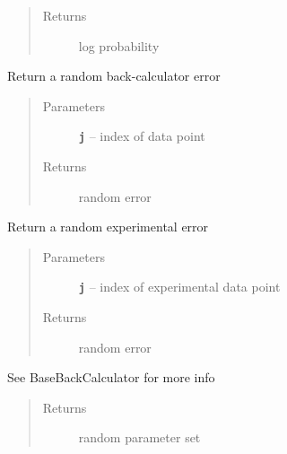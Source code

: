 \documentclass[letterpaper,10pt,english]{sphinxmanual}
\begin{document}
\begin{fulllineitems}
\begin{fulllineitems}
\begin{quote}
\begin{description}
\begin{itemize}
\end{itemize}

\item[{Returns}] \leavevmode
log probability

\end{description}\end{quote}

\end{fulllineitems}


\begin{fulllineitems}
\label{modules:eisd.DataEISD._random_bc_err}
Return a random back-calculator error
\begin{quote}\begin{description}
\item[{Parameters}] \leavevmode
\textbf{\texttt{j}} -- index of data point

\item[{Returns}] \leavevmode
random error

\end{description}\end{quote}

\end{fulllineitems}


\begin{fulllineitems}
\label{modules:eisd.DataEISD._random_exp_err}
Return a random experimental error
\begin{quote}\begin{description}
\item[{Parameters}] \leavevmode
\textbf{\texttt{j}} -- index of experimental data point

\item[{Returns}] \leavevmode
random error

\end{description}\end{quote}

\end{fulllineitems}


\begin{fulllineitems}
\label{modules:eisd.DataEISD._random_params}
See BaseBackCalculator for more info
\begin{quote}\begin{description}
\item[{Returns}] \leavevmode
random parameter set


\end{description}
\end{quote}
\end{fulllineitems}
\end{fulllineitems}
\end{document}
